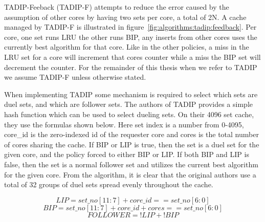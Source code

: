 TADIP-Feeback (TADIP-F) attempts to reduce the error caused by the assumption of other cores by having two sets per core, a total of 2N.
A cache managed by TADIP-F is illustrated in figure~\ref{fig:algorithms:tadip:feedback}.
Per core, one set runs LRU the other runs BIP, any inserts from other cores uses the currently best algorithm for that core.
Like in the other policies, a miss in the LRU set for a core will increment that cores counter while a miss the BIP set will decrement the counter.
For the remainder of this thesis when we refer to TADIP we assume TADIP-F unless otherwise stated.

When implementing TADIP some mechanism is required to select which sets are duel sets, and which are follower sets.
The authors of TADIP provides a simple hash function which can be used to select dueling sets.
On their 4096 set cache, they use the formulas shown below.
Here set index is a number from 0-4095, core\_id is the zero-indexed id of the requester core and cores is the total number of cores sharing the cache.
If BIP or LIP is true, then the set is a duel set for the given core, and the policy forced to either BIP or LIP.
If both BIP and LIP is false, then the set is a normal follower set and utilizes the current best algorithm for the given core.
From the algorithm, it is clear that the original authors use a total of 32 groups of duel sets spread evenly throughout the cache.
\begin{figure}[ht]
\begin{equation}
LIP = set\_no[11:7] + core\_id == set\_no[6:0]
\end{equation}
\begin{equation}
BIP = set\_no[11:7] + core\_id + cores == set\_no[6:0]
\end{equation}
\begin{equation}
FOLLOWER = !LIP + !BIP
\end{equation}
\end{figure}
